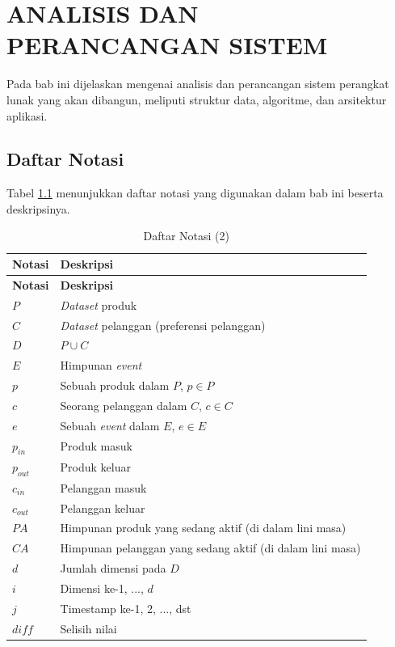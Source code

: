 \chapter{ANALISIS DAN PERANCANGAN SISTEM} \label{chap:analisis-perancangan-sistem}
\tab Pada bab ini dijelaskan mengenai analisis dan perancangan sistem perangkat lunak yang akan dibangun, meliputi struktur data, algoritme, dan arsitektur aplikasi. 

\section{Daftar Notasi}
\tab Tabel \ref{tab:daftar-notasi-2} menunjukkan daftar notasi yang digunakan dalam bab ini beserta deskripsinya.

\begin{longtable}{| p{3cm} | p{6cm} |} 
	\caption{Daftar Notasi (2) \label{tab:daftar-notasi-2}}\\
	\hline
	\textbf{Notasi} & \textbf{Deskripsi}\\ \hline
	\endfirsthead
	\hline
	\textbf{Notasi} & \textbf{Deskripsi}\\ \hline
	\endhead
	$P$ & \textit{Dataset} produk\\ \hline
	$C$ & \textit{Dataset} pelanggan (preferensi pelanggan)\\ \hline
	$D$ & $P \cup C$ \\ \hline
	$E$ & Himpunan \textit{event} \\ \hline
	$p$ & Sebuah produk dalam $P$, $p \in P$\\ \hline
	$c$ & Seorang pelanggan dalam $C$, $c \in C$\\ \hline
	$e$ & Sebuah \textit{event} dalam $E$, $e \in E$ \\ \hline
	$p_{in}$ & Produk masuk \\ \hline
	$p_{out}$ & Produk keluar \\ \hline
	$c_{in}$ & Pelanggan masuk \\ \hline
	$c_{out}$ & Pelanggan keluar \\ \hline
	$PA$ & Himpunan produk yang sedang aktif (di dalam lini masa) \\ \hline	
	$CA$ & Himpunan pelanggan yang sedang aktif (di dalam lini masa) \\ \hline
	$d$ & Jumlah dimensi pada $D$\\ \hline
	$i$ & Dimensi ke-1, ..., $d$\\ \hline
	$j$ & Timestamp ke-1, 2, ..., dst\\ \hline
	$diff$ & Selisih nilai \\ \hline

\end{longtable}
